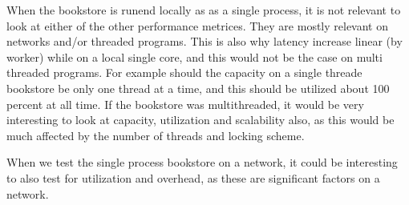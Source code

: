 \documentclass[a4paper, 11pt]{article}
\begin{document}
When the bookstore is runend locally as as a single process, it is not 
relevant to look at either of the other performance metrices. They are mostly relevant on networks and/or threaded programs. This is also why latency increase linear (by worker) while on a local single core, and this would not be the case on multi threaded programs. For example should the capacity on a single threade bookstore be only one thread at a time, and this should be utilized about 100 percent at all time.
If the bookstore was multithreaded, it would be very interesting to look at capacity, utilization and scalability also, as this would be much affected by the number of threads and locking scheme.

When we test the single process bookstore on a network, it could be interesting to also test for utilization and overhead, as these are significant factors on a network.


\end{document}
